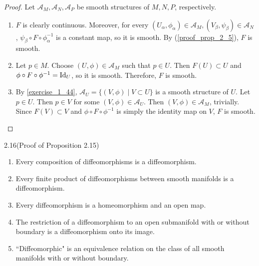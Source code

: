 \begin{proof}
  Let $\mathcal{A}_M, \mathcal{A}_N, \mathcal{A}_P$ be smooth structures of $M, N, P$, respectively.
  \begin{enumerate}[label=(\alph*)]
    \item 
      $F$ is clearly continuous.
      Moreover, for every $(U_{\alpha}, \phi_{\alpha}) \in \mathcal{A}_M, (V_{\beta}, \psi_{\beta}) \in \mathcal{A}_N$, $\psi_{\beta} \circ F \circ \phi_{\alpha}^{-1}$ is a constant map, so it is smooth.
      By (\ref{proof_prop_2_5}), $F$ is smooth.
    \item
      Let $p \in M$.
      Choose $(U, \phi) \in \mathcal{A}_M$ such that $p \in U$.
      Then $F(U) \subset U$ and $\phi \circ F \circ \phi^{-1} = \operatorname{Id}_U$, so it is smooth.
      Therefore, $F$ is smooth.
    \item
      By \ref{exercise_1_44}, $\mathcal{A}_U = \{ (V, \phi) \mid V \subset U \}$ is a smooth structure of $U$.
      Let $p \in U$.
      Then $p \in V$ for some $(V, \phi) \in \mathcal{A}_U$.
      Then $(V, \phi) \in \mathcal{A}_M$, trivially.
      Since $F(V) \subset V$ and $\phi \circ F \circ \phi^{-1}$ is simply the identity map on $V$, $F$ is smooth.
  \end{enumerate}
\end{proof}

\begin{customexer}{2.16(Proof of Proposition 2.15)}\label{exercise_2_16}
  $ $
  \begin{enumerate}[label=(\alph*)]
    \item 
      Every composition of diffeomorphisms is a diffeomorphism.
    \item
      Every finite product of diffeomorphisms between smooth manifolds is a diffeomorphism.
    \item
      Every diffeomorphism is a homeomorphism and an open map.
    \item
      The restriction of a diffeomorphism to an open submanifold with or without boundary is a diffeomorphism onto its image.
    \item
      ``Diffeomorphic" is an equivalence relation on the class of all smooth manifolds with or without boundary.
  \end{enumerate}
\end{customexer}

